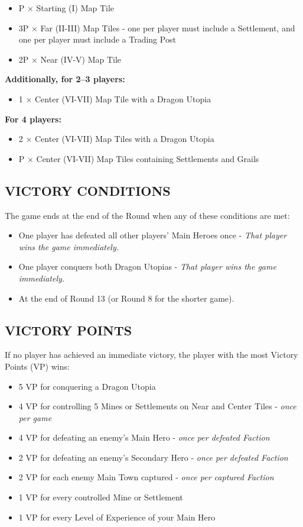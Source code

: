\begin{multicols*}{2}
\begin{itemize}
  \item P × Starting (I) Map Tile
  \item 3P × Far (II-III) Map Tiles - one per player must include a Settlement, and one per player must include a Trading Post
  \item 2P × Near (IV-V) Map Tile
\end{itemize}

\textbf{Additionally, for 2--3 players:}
\begin{itemize}
  \item 1 × Center (VI-VII) Map Tile with a Dragon Utopia
\end{itemize}

\textbf{For 4 players:}
\begin{itemize}
  \item 2 × Center (VI-VII) Map Tiles with a Dragon Utopia
  \item P × Center (VI-VII) Map Tiles containing Settlements and Grails
\end{itemize}

\subsection*{\MakeUppercase{Victory Conditions}}
The game ends at the end of the Round when any of these conditions are met:

\begin{itemize}
 \item One player has defeated all other players' Main Heroes once - \textit{That player wins the game immediately.}
 \item One player conquers both Dragon Utopias - \textit{That player wins the game immediately.}
 \item At the end of Round 13 (or Round 8 for the shorter game).
\end{itemize}

\subsection*{\MakeUppercase{Victory Points}}
If no player has achieved an immediate victory, the player with the most Victory Points (VP) wins:

\begin{itemize}
 \item 5 VP for conquering a Dragon Utopia
 \item 4 VP for controlling 5 Mines or Settlements on Near and Center Tiles - \textit{once per game}
 \item 4 VP for defeating an enemy's Main Hero - \textit{once per defeated Faction}
 \item 2 VP for defeating an enemy's Secondary Hero - \textit{once per defeated Faction}
 \item 2 VP for each enemy Main Town captured - \textit{once per captured Faction}
 \item 1 VP for every controlled Mine or Settlement
 \item 1 VP for every Level of Experience of your Main Hero
\end{itemize}


\end{multicols*}
